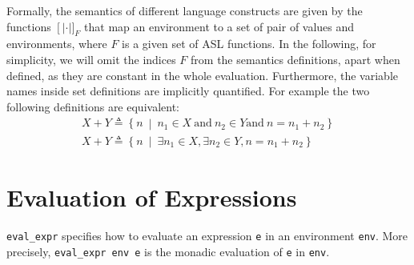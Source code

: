 \documentclass{book}
\newcommand\llbracket{[|}
\newcommand\rrbracket{|]}
\newcommand\interp[1]{\left\llbracket #1 \right\rrbracket}
\newcommand\st[0]{\ \middle|\ }
\begin{document}
%
Formally, the semantics of different language constructs are given by the functions
$\interp{\cdot}_F$ that map an environment to a set of pair of values and
environments, where $F$ is a given set of ASL functions.
%
In the following, for simplicity, we will omit the indices $F$ from the
semantics definitions, apart when defined, as they are constant in the whole
evaluation.
%
Furthermore, the variable names inside set definitions are implicitly
quantified. For example the two following definitions are equivalent:
%
\begin{gather*}
  X + Y \triangleq \left\{ n \st{} n_1 \in X \ \text{and}\ n_2 \in Y \text{and}\ n = n_1 + n_2 \right\}
  \\
  X + Y \triangleq \left\{ n \st{} \exists n_1 \in X, \exists n_2 \in Y, n = n_1 + n_2 \right\}
\end{gather*}

\section{Evaluation of Expressions}

\texttt{eval\_expr} specifies how to evaluate an expression \texttt{e} in an
environment \texttt{env}. More precisely, \texttt{eval\_expr env e} is the
monadic evaluation  of \texttt{e} in \texttt{env}.
\end{document}
